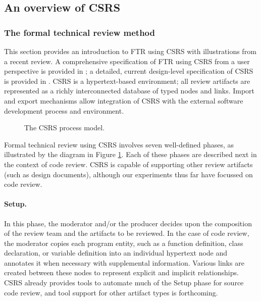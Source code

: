 

\subsection{An overview of CSRS}
\label{sec:csrs}

\subsubsection{The formal technical review method}

This section provides an introduction to FTR using CSRS with illustrations
from a recent review.  A comprehensive specification of FTR using CSRS from
a user perspective is provided in \cite{csdl-93-11}; a detailed, current
design-level specification of CSRS is provided in \cite{csdl-92-11}.  CSRS
is a hypertext-based environment; all review artifacts are represented as a
richly interconnected database of typed nodes and links. Import and
export mechanisms allow integration of CSRS with the external software
development process and environment.  

\begin{figure}
 {\centerline{}}
\caption{The CSRS process model.}
\label{fig:process-model}
\end{figure}

Formal technical review using CSRS involves seven well-defined phases, as
illustrated by the diagram in Figure \ref{fig:process-model}.  Each of these
phases are described next in the context of code review.  CSRS is capable of
supporting other review artifacts (such as design documents), although our
experiments thus far have focussed on code review.

\paragraph{Setup.} In this phase, the moderator and/or the producer decides upon
the composition of the review team and the artifacts to be reviewed.  In
the case of code review, the moderator copies each program entity, such as
a function definition, class declaration, or variable definition into an
individual hypertext node and annotates it when necessary with supplemental
information.  Various links are created between these nodes to represent
explicit and implicit relationships. CSRS already provides tools to
automate much of the Setup phase for source code review, and tool support
for other artifact types is forthcoming.

